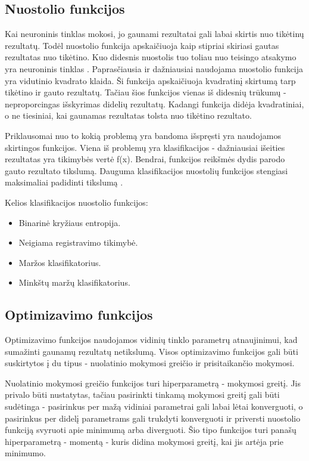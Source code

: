 \documentclass{VUMIFPSkursinis}
\begin{document}
\subsection{Nuostolio funkcijos}
Kai neuroninis tinklas mokosi, jo gaunami rezultatai gali labai skirtis nuo tikėtinų rezultatų. Todėl nuostolio funkcija apskaičiuoja kaip stipriai
skiriasi gautas rezultatas nuo tikėtino. Kuo didesnis nuostolis tuo toliau nuo teisingo atsakymo yra neuroninis tinklas \cite{Cameron-loss-fun}.
Paprasčiausia ir dažniausiai naudojama nuostolio funkcija yra vidutinio kvadrato klaida. Ši funkcija apskaičiuoja kvadratinį skirtumą tarp tikėtino 
ir gauto rezultatų. Tačiau šios funkcijos vienas iš didesnių trūkumų - neproporcingas išskyrimas didelių rezultatų. Kadangi funkcija didėja kvadratiniai,
o ne tiesiniai, kai gaunamas rezultatas tolsta nuo tikėtino rezultato.

Priklausomai nuo to kokią problemą yra bandoma išspręsti yra naudojamos skirtingos funkcijos. Viena iš problemų yra klasifikacijos - dažniausiai išeities
rezultatas yra tikimybės vertė f(x). Bendrai, funkcijos reikšmės dydis parodo gauto rezultato tikslumą. Dauguma klasifikacijos nuostolių funkcijos stengiasi
maksimaliai padidinti tikslumą \cite{clas-loss-2017}. 


Kelios klasifikacijos nuostolio funkcijos:
\begin{itemize}
\item Binarinė kryžiaus entropija.
\item Neigiama registravimo tikimybė.
\item Maržos klasifikatorius.
\item Minkštų maržų klasifikatorius.
\end{itemize}

\subsection{Optimizavimo funkcijos}
Optimizavimo funkcijos naudojamos vidinių tinklo parametrų atnaujinimui, kad sumažinti gaunamų rezultatų netikslumą. 
Visos optimizavimo funkcijos gali būti suskirtytos į du tipus - nuolatinio mokymosi greičio ir prisitaikančio mokymosi.

Nuolatinio mokymosi greičio funkcijos turi hiperparametrą - mokymosi greitį. Jis privalo būti nustatytas, tačiau 
pasirinkti tinkamą mokymosi greitį gali būti sudėtinga - pasirinkus per mažą vidiniai parametrai gali labai lėtai 
konverguoti, o pasirinkus per didelį parametrams gali trukdyti konverguoti ir priversti nuostolio funkciją svyruoti
apie minimumą arba diverguoti. Šio tipo funkcijos turi panašų hiperparametrą - momentą - kuris didina mokymosi greitį, 
kai jis artėja prie minimumo. 
\end{document}

